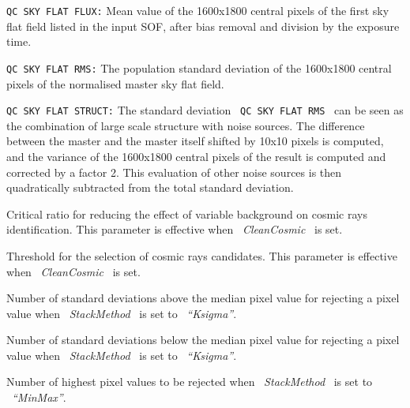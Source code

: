 \begin{description}
\begin{description}

\item {\tt QC SKY FLAT FLUX:} Mean value of the 1600x1800 central pixels 
                   of the first sky flat field listed in the input SOF,
                   after bias removal and division by the exposure time.
\item {\tt QC SKY FLAT RMS:} The population standard deviation of the 
                   1600x1800 central pixels of the normalised master 
                   sky flat field.
\item {\tt QC SKY FLAT STRUCT:} The standard deviation 
                   \ {\tt QC SKY FLAT RMS} \ 
                   can be seen as the combination of large scale
                   structure with noise sources. The difference
                   between the master and the master itself shifted by
                   10x10 pixels is computed, and the variance of the
                   1600x1800 central pixels of the result is computed
                   and corrected by a factor 2. This evaluation of
                   other noise sources is then quadratically subtracted
                   from the total standard deviation.

\end{description}

\item [CosmicRatio:]    Critical ratio for reducing the effect of variable
                        background on cosmic rays identification. This 
                        parameter is effective when \ {\it CleanCosmic} 
                        \ is set.

\item [CosmicThreshold:]  Threshold for the selection of cosmic rays
                        candidates. This parameter is effective when 
                        \ {\it CleanCosmic} \ is set.

\item [KSigmaHigh:]  Number of standard deviations above the median pixel
                    value for rejecting a pixel value
                    when \ {\it StackMethod} \ is set to \ {\it ``Ksigma''}.

\item [KSigmaLow:]  Number of standard deviations below the median pixel
                    value for rejecting a pixel value
                    when \ {\it StackMethod} \ is set to \ {\it ``Ksigma''}.

\item [MaxRejection:]  Number of highest pixel values to be rejected 
                       when \ {\it StackMethod} \ is set to \ {\it ``MinMax''}.


\end{description}
